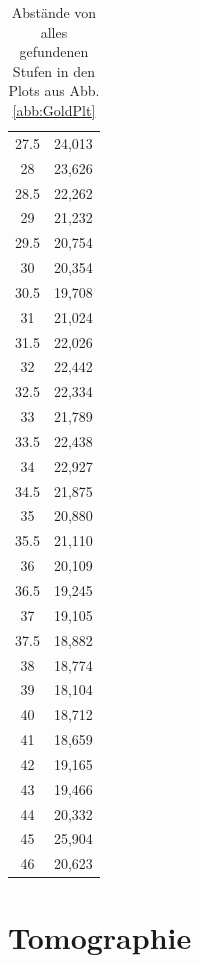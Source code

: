 \begin{table}[h]
\begin{center}
\begin{tabular}[central]{ c | c }
27.5	&	24,013	\\
28	&	23,626	\\
28.5	&	22,262	\\
29	&	21,232	\\
29.5	&	20,754	\\
30	&	20,354	\\
30.5	&	19,708	\\
31	&	21,024	\\
31.5	&	22,026	\\
32	&	22,442	\\
32.5	&	22,334	\\
33	&	21,789	\\
33.5	&	22,438	\\
34	&	22,927	\\
34.5	&	21,875	\\
35	&	20,880	\\
35.5	&	21,110	\\
36	&	20,109	\\
36.5	&	19,245	\\
37	&	19,105	\\
37.5	&	18,882	\\
38	&	18,774	\\
39	&	18,104	\\
40	&	18,712	\\
41	&	18,659	\\
42	&	19,165	\\
43	&	19,466	\\
44	&	20,332	\\
45	&	25,904	\\
46	&	20,623	\\
\end{tabular}
\caption{Abstände von alles gefundenen Stufen in den Plots aus Abb. \ref{abb:GoldPlt}}
\label{tab:wenner}
\end{center}
\end{table}


\section{Tomographie}

